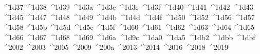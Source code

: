 {  ^^^^1d37%
  ^^^^1d38%
  ^^^^1d39%
  ^^^^1d3a%
  ^^^^1d3c%
  ^^^^1d3e%
  ^^^^1d3f%
  ^^^^1d40%
  ^^^^1d41%
  ^^^^1d42%
  ^^^^1d43%
  ^^^^1d45%
  ^^^^1d47%
  ^^^^1d48%
  ^^^^1d49%
  ^^^^1d4b%
  ^^^^1d4d%
  ^^^^1d4f%
  ^^^^1d50%
  ^^^^1d52%
  ^^^^1d56%
  ^^^^1d57%
  ^^^^1d58%
  ^^^^1d5b%
  ^^^^1d5d%
  ^^^^1d5e%
  ^^^^1d5f%
  ^^^^1d60%
  ^^^^1d61%
  ^^^^1d62%
  ^^^^1d63%
  ^^^^1d64%
  ^^^^1d65%
  ^^^^1d66%
  ^^^^1d67%
  ^^^^1d68%
  ^^^^1d69%
  ^^^^1d6a%
  ^^^^1d9c%
  ^^^^1da0%
  ^^^^1da5%
  ^^^^1db2%
  ^^^^1dbb%
  ^^^^1dbf%
  ^^^^2002%
  ^^^^2003%
  ^^^^2005%
  ^^^^2009%
  ^^^^200a%
  ^^^^2013%
  ^^^^2014%
  ^^^^2016%
  ^^^^2018%
  ^^^^2019%
}
